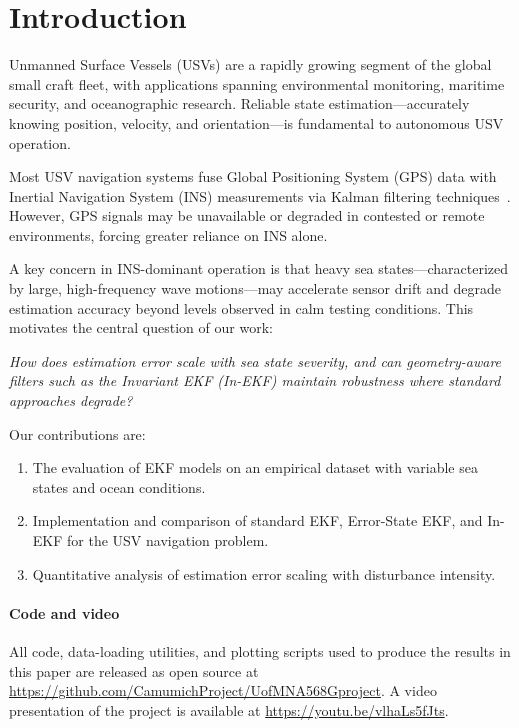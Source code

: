 \documentclass[conference]{IEEEtran}
\begin{document}
\section{Introduction}
\label{sec:intro}

Unmanned Surface Vessels (USVs) are a rapidly growing segment of the global small craft fleet, with applications spanning environmental monitoring, maritime security, and oceanographic research. Reliable state estimation---accurately knowing position, velocity, and orientation---is fundamental to autonomous USV operation.

Most USV navigation systems fuse Global Positioning System (GPS) data with Inertial Navigation System (INS) measurements via Kalman filtering techniques~\cite{hawaii_usv}. However, GPS signals may be unavailable or degraded in contested or remote environments, forcing greater reliance on INS alone.

A key concern in INS-dominant operation is that heavy sea states---characterized by large, high-frequency wave motions---may accelerate sensor drift and degrade estimation accuracy beyond levels observed in calm testing conditions. This motivates the central question of our work:

\emph{How does estimation error scale with sea state severity, and can geometry-aware filters such as the Invariant EKF (In-EKF) maintain robustness where standard approaches degrade?}

Our contributions are:
\begin{enumerate}
  \item The evaluation of EKF models on an empirical dataset with variable sea states and ocean conditions.
  \item Implementation and comparison of standard EKF, Error-State EKF, and In-EKF for the USV navigation problem.
  \item Quantitative analysis of estimation error scaling with disturbance intensity.
\end{enumerate}

\paragraph*{Code and video}
All code, data-loading utilities, and plotting scripts used to produce the results in this paper are released as open source at \url{https://github.com/CamumichProject/UofMNA568Gproject}. A video presentation of the project is available at \url{https://youtu.be/vlhaLs5fJts}.
\end{document}
